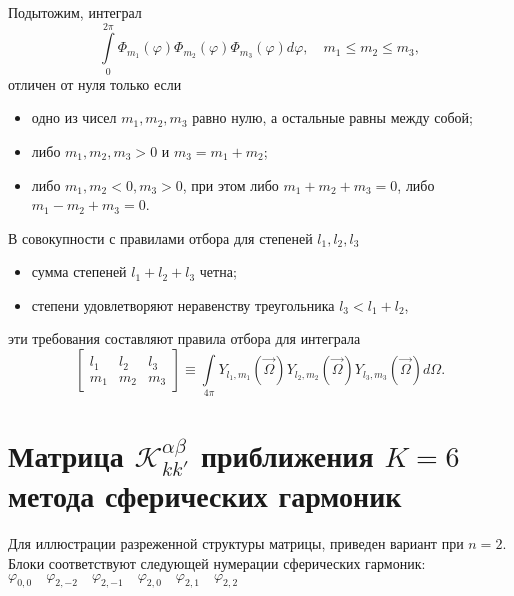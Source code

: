 Подытожим, интеграл 
\[
\int\limits_{0}^{2\pi} \Phi_{m_1}(\varphi)\Phi_{m_2}(\varphi)\Phi_{m_3}(\varphi) d\varphi, \quad 
m_1 \leq m_2 \leq m_3,
\]
отличен от нуля только если
\begin{itemize}
\item одно из чисел $m_1, m_2, m_3$ равно нулю, а остальные равны между собой;
\item либо $m_1, m_2, m_3 > 0$ и $m_3 = m_1 + m_2$;
\item либо $m_1, m_2 < 0, m_3 > 0$, при этом либо $m_1 + m_2 + m_3 = 0$, либо $m_1 - m_2 + m_3 = 0$.
\end{itemize}
В совокупности с правилами отбора для степеней $l_1, l_2, l_3$
\begin{itemize}
\item сумма степеней $l_1 + l_2 + l_3$ четна;
\item степени удовлетворяют неравенству треугольника $l_3 < l_1 + l_2$,
\end{itemize}
эти требования составляют правила отбора для интеграла
\[
\begin{bmatrix}
l_1 & l_2 & l_3\\
m_1 & m_2 & m_3
\end{bmatrix} \equiv
\int\limits_{4\pi}
Y_{l_1,m_1}(\vec \Omega)
Y_{l_2,m_2}(\vec \Omega)
Y_{l_3,m_3}(\vec \Omega)
d\Omega.
\]

\section{Матрица \texorpdfstring{$\mathscr{K}^{\alpha\beta}_{kk'}$}{K\^ab\_kk'} приближения \texorpdfstring{$K = 6$}{K = 6} метода сферических гармоник}
\label{sec:oioj}

Для иллюстрации разреженной структуры матрицы, приведен вариант при $n = 2$. Блоки соответствуют следующей нумерации сферических гармоник: 
$\varphi_{0,0}\quad \varphi_{2,-2}\quad \varphi_{2,-1}\quad \varphi_{2,0}\quad \varphi_{2,1}\quad \varphi_{2,2}$

